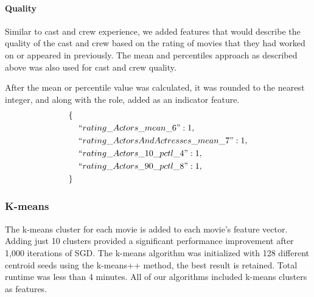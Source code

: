 \documentclass[journal]{IEEEtran}
\begin{document}
\paragraph{Quality}

Similar to cast and crew experience, we added features that would describe the quality of the cast and crew based on the rating of movies that they had worked on or appeared in previously.  The mean and percentiles approach as described above was also used for cast and crew quality.
\begin{center}
\end{center}

After the mean or percentile value was calculated, it was rounded to the nearest integer, and along with the role, added as an indicator feature.
\begin{align*}
        \{\ \ &\\
        &``rating\_Actors\_mean\_6": 1,\\
        &``rating\_ActorsAndActresses\_mean\_7": 1,\\
        &``rating\_Actors\_10\_pctl\_4": 1,\\
        &``rating\_Actors\_90\_pctl\_8": 1,\\
        \}\ \ &
\end{align*}

\subsubsection{K-means}
The k-means cluster for each movie is added to each movie's feature vector.
Adding just 10 clusters provided a significant performance improvement after
1,000 iterations of SGD.  The k-means algorithm was initialized with 128 different
centroid seeds using the k-means++ method, the best result is retained.  Total
runtime was less than 4 minutes.  All of our algorithms included k-means clusters as features.
\end{document}
